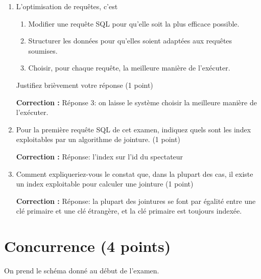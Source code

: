 \documentclass[10pt]{article}
\newenvironment{solution}{\vspace{6pt}\noindent\color{red}\textbf{Correction : }}{\vspace{6pt}\ignorespacesafterend}
\begin{document}
\begin{enumerate}
\item L’optimisation de requêtes, c’est 
\begin{enumerate}
    \item Modifier une requête SQL pour qu’elle soit la plus efficace possible.
    \item Structurer les données pour qu’elles soient adaptées aux requêtes soumises.
    \item Choisir, pour chaque requête, la meilleure manière de l’exécuter.
\end{enumerate}

Justifiez brièvement votre réponse (1 point)

\begin{solution}
Réponse 3: on laisse le système choisir la meilleure manière de l’exécuter.
\end{solution}

\item Pour la première requête SQL de cet examen, indiquez quels sont les index exploitables par 
un algorithme de jointure. (1 point)

\begin{solution}
Réponse: l'index sur l'id du spectateur
\end{solution}

\item Comment expliqueriez-vous le constat que, dans la plupart des cas,  il existe un index 
exploitable pour calculer une jointure  (1 point)

\begin{solution}
Réponse: la plupart des jointures se font par égalité entre une clé primaire et une clé étrangère,
et la clé primaire est toujours indexée.
\end{solution}

\end{enumerate}

\section{Concurrence (4 points)}

On prend le schéma donné au début de l'examen.
      
\end{document}
